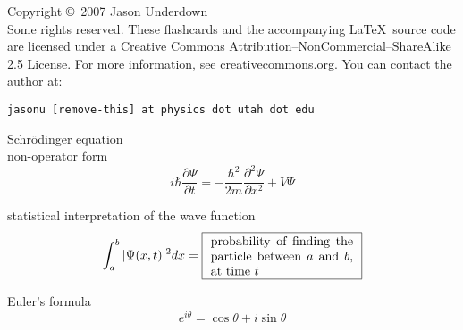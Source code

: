 \documentclass[avery5371,grid]{flashcards}
\begin{document}

\begin{flashcard}{Copyright \copyright \, 2007 Jason Underdown \\
Some rights reserved.}
These flashcards and the accompanying \LaTeX \, source code are licensed
under a Creative Commons Attribution--NonCommercial--ShareAlike 2.5 License.  
For more information, see creativecommons.org.  You can contact the author at:
\begin{center}
\begin{small}\tt jasonu [remove-this] at physics dot utah dot edu\end{small}
\end{center}
\end{flashcard}

\begin{flashcard}[Equation]{Schr\"odinger equation\\non-operator form}
\begin{displaymath}
i\hbar \frac{\partial \Psi}{\partial t} = -\frac{\hbar^2}{2m}
\frac{\partial^2 \Psi}{\partial x^2} + V \Psi
\end{displaymath}
\end{flashcard}

\begin{flashcard}[Definition]{statistical interpretation of the wave function}
\begin{displaymath}
\int_a^b |\Psi(x,t)|^2 dx =
\framebox[4.5cm]{\parbox[c]{4cm}{probability of finding the particle
between $a$ and $b$, at time $t$}}
\end{displaymath}
\end{flashcard}

\begin{flashcard}[Formula]{Euler's formula}
\begin{displaymath}
e^{i\theta} = \cos \theta + i\sin \theta
\end{displaymath}
\end{flashcard}
\end{document}
